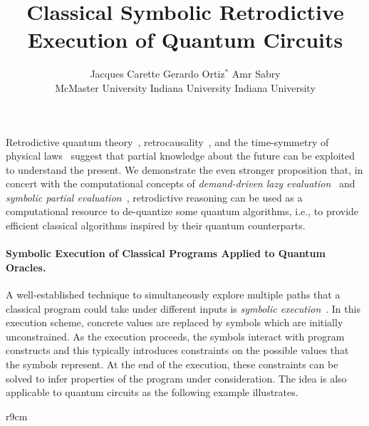 \documentclass{article}
\title{Classical Symbolic Retrodictive Execution of Quantum Circuits}
\author{Jacques Carette \qquad\qquad Gerardo Ortiz$^{*}$ \qquad\qquad Amr Sabry \\
McMaster University \qquad Indiana University \qquad Indiana University}
\begin{document}
\maketitle

\begin{refsection}

Retrodictive quantum theory~\cite{sym13040586},
retrocausality~\cite{Aharonov2008}, and the time-symmetry of physical
laws~\cite{RevModPhys.27.179} suggest that partial knowledge about the
future can be exploited to understand the present. We demonstrate the
even stronger proposition that, in concert with the computational
concepts of \emph{demand-driven lazy evaluation}~\cite{lazyevaluator}
and \emph{symbolic partial evaluation}~\cite{futamura}, retrodictive
reasoning can be used as a computational resource to de-quantize some
quantum algorithms, i.e., to provide efficient classical algorithms
inspired by their quantum counterparts.

\paragraph*{Symbolic Execution of Classical Programs Applied to Quantum Oracles.}
A well-established technique to simultaneously explore multiple paths
that a classical program could take under different inputs is
\emph{symbolic
  execution}~\cite{10.1145/390016.808445,10.1145/360248.360252,howden,10.1145/800191.805647,10.1145/3182657}. In
this execution scheme, concrete values are replaced by symbols which are
initially unconstrained. As the execution proceeds, the symbols
interact with program constructs and this typically introduces
constraints on the possible values that the symbols represent. At the
end of the execution, these constraints can be solved to infer
properties of the program under consideration. The idea is also
applicable to quantum circuits as the following example illustrates.

\begin{wrapfigure}{r}{9cm}
\end{wrapfigure}
\end{refsection}
\end{document}
